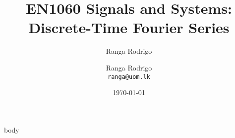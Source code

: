 \documentclass[t, aspectratio=169,xcolor={svgnames}, 10pt]{beamer}
\title{EN1060 Signals and Systems: Discrete-Time Fourier Series}
\author{Ranga Rodrigo}
\author[]{Ranga Rodrigo\\ \texttt{ranga@uom.lk}}
\institute[]{The University of Moratuwa, Sri Lanka}
\date{\today}
\begin{document}
    \begin{frame}
        \titlepage
    \end{frame}












    {body}






\end{document}
